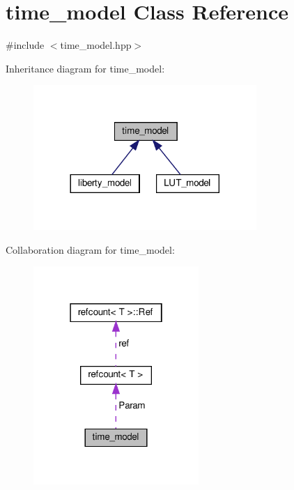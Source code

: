 \hypertarget{classtime__model}{}\section{time\+\_\+model Class Reference}
\label{classtime__model}


{\ttfamily \#include $<$time\+\_\+model.\+hpp$>$}



Inheritance diagram for time\+\_\+model\+:
\nopagebreak
\begin{figure}[H]
\begin{center}
\leavevmode
\includegraphics[width=240pt]{da/d63/classtime__model__inherit__graph}
\end{center}
\end{figure}


Collaboration diagram for time\+\_\+model\+:
\nopagebreak
\begin{figure}[H]
\begin{center}
\leavevmode
\includegraphics[width=178pt]{d0/d8c/classtime__model__coll__graph}
\end{center}
\end{figure}
